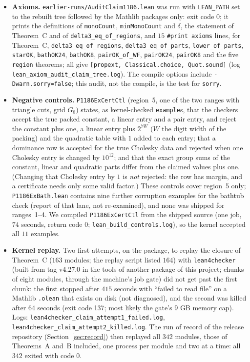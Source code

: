 \documentclass[11pt]{amsart}
\theoremstyle{remark}
\newcommand{\lean}[1]{\texttt{#1}}
\begin{document}
\begin{itemize}
\item \textbf{Axioms.} \texttt{earlier-runs/AuditClaim1186.lean} was run with \texttt{LEAN\_PATH} set to the rebuilt tree followed by the Mathlib packages only: exit code $0$; it prints the definitions of \lean{monoCount}, \lean{minMonoCount} and $\delta$, the statement of Theorem~C and of \lean{delta3\_eq\_of\_regions}, and $15$ \lean{\#print axioms} lines, for Theorem~C, \lean{delta3\_eq\_of\_regions}, \lean{delta3\_eq\_of\_parts}, \lean{lower\_of\_parts}, \lean{starOK}, \lean{bathOK24}, \lean{bathOK8}, \lean{pairOK\_of\_WF}, \lean{pairOK24}, \lean{pairOK8} and the five \lean{region} theorems; all give \lean{[propext, Classical.choice, Quot.sound]} (log \texttt{lean\_axiom\_audit\_claim\_tree.log}). The compile options include \texttt{-Dwarn.sorry=false}; this audit, not the compile, is the test for \texttt{sorry}.
\item \textbf{Negative controls.} \texttt{P1186ExCertCtl} (region~5, one of the two ranges with triangle cuts, grid $G_8$) states, as kernel-checked \texttt{example}s, that the checkers accept the true packed constant, a linear entry and a pair entry, and reject the constant plus one, a linear entry plus $2^{7W}$ ($W$ the digit width of the packing) and the quadratic table with $1$ added to each entry; that a dominance row is accepted for the true Cholesky data and rejected when one Cholesky entry is changed by $10^{12}$; and that the exact group sums of the constant, linear and quadratic parts differ from the claimed values plus one. (Changing that Cholesky entry by $1$ is \emph{not} rejected: the row has margin, and a certificate needs only some valid factor.) These controls cover region~5 only; \texttt{P1186ExBath.lean} contains nine further corruption examples for the bathtub check (report of that lane, not re-examined), and none was shipped for ranges~1--4. We compiled \texttt{P1186ExCertCtl} from the shipped source (one job, $74$ seconds, return code $0$; \texttt{lean\_build\_controls.log}), so the kernel accepted all $11$ examples.
\item \textbf{Kernel replay.} Two first attempts, on the package, to replay the closure of Theorem~C ($163$ modules; the replay script listed $164$) with \texttt{lean4checker} (built from tag v4.27.0 in the tools of another package of this project; chunks of eight modules, through the machine's job gate) did not get past the first chunk: the first stopped after $415$ seconds with ``failed to read file'' on a Mathlib \texttt{.olean} that exists on disk (not diagnosed), and the second was killed after $64$ seconds (exit code 137; most likely the gate's $9$ GB memory cap). Logs: \texttt{lean4checker\_claim\_attempt1\_failed.log}, \texttt{lean4checker\_claim\_attempt2\_killed.log}. The run of record of the release repository (Section~\ref{sec:record}) then replayed all $342$ modules, those of Theorems~A and~B included, one process per module and two at a time: all $342$ exited with code $0$.

\end{itemize}
\end{document}
